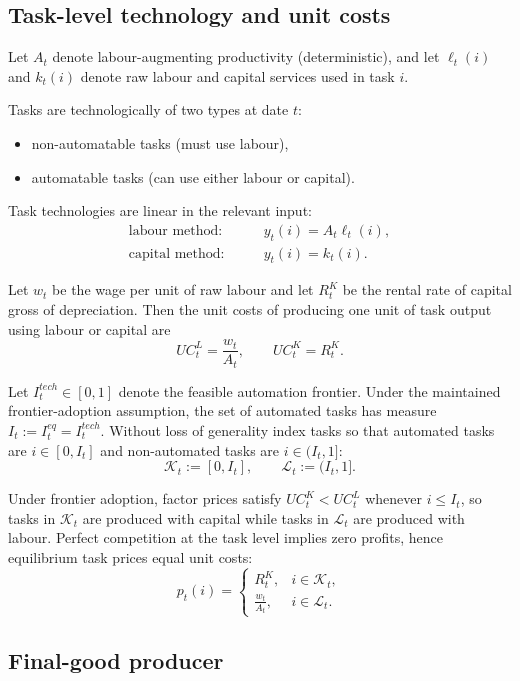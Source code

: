 \documentclass{article}
\begin{document}
\subsection{Task-level technology and unit costs}

Let $A_t$ denote labour-augmenting productivity (deterministic), and let $\ell_t(i)$ and $k_t(i)$ denote raw labour and capital services used in task $i$.

Tasks are technologically of two types at date $t$:
\begin{itemize}
\item non-automatable tasks (must use labour),
\item automatable tasks (can use either labour or capital).
\end{itemize}

Task technologies are linear in the relevant input:
\begin{align*}
\text{labour method:}\qquad & y_t(i) = A_t \ell_t(i),\\
\text{capital method:}\qquad & y_t(i) = k_t(i).
\end{align*}

Let $w_t$ be the wage per unit of raw labour and let $R^K_t$ be the rental rate of capital gross of depreciation. Then the unit costs of producing one unit of task output using labour or capital are
$$
UC^L_t = \frac{w_t}{A_t},
\qquad
UC^K_t = R^K_t.
$$

Let $I^{tech}_t \in [0,1]$ denote the feasible automation frontier. Under the maintained frontier-adoption assumption, the set of automated tasks has measure $I_t := I^{eq}_t = I^{tech}_t$. Without loss of generality index tasks so that automated tasks are $i \in [0,I_t]$ and non-automated tasks are $i \in (I_t,1]$:
$$
\mathcal K_t := [0,I_t],
\qquad
\mathcal L_t := (I_t,1].
$$

Under frontier adoption, factor prices satisfy $UC^K_t < UC^L_t$ whenever $i \le I_t$, so tasks in $\mathcal K_t$ are produced with capital while tasks in $\mathcal L_t$ are produced with labour. Perfect competition at the task level implies zero profits, hence equilibrium task prices equal unit costs:
$$
p_t(i) =
\begin{cases}
R^K_t, & i \in \mathcal K_t,\\[6pt]
\frac{w_t}{A_t}, & i \in \mathcal L_t.
\end{cases}
$$

\subsection{Final-good producer}
\end{document}
